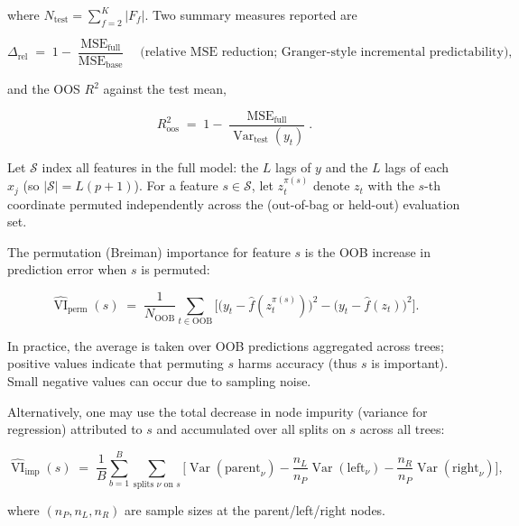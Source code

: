 \documentclass[preprint, 3p,
authoryear]{elsarticle} %
\begin{document}
\noindent where \(N_{\text{test}}=\sum_{f=2}^K |F_f|\). Two summary
measures reported are

\begin{equation}
\Delta_{\text{rel}} \;=\; 1-\frac{\operatorname{MSE}_{\text{full}}}{\operatorname{MSE}_{\text{base}}}
\quad\text{(relative MSE reduction; Granger-style incremental predictability),}
\end{equation}

\noindent and the OOS \(R^2\) against the test mean,

\begin{equation}
R^2_{\text{oos}} \;=\; 1 - \frac{\operatorname{MSE}_{\text{full}}}{\operatorname{Var}_{\text{test}}(y_t)}.
\end{equation}

Let \(\mathcal{S}\) index all features in the full model: the \(L\) lags
of \(y\) and the \(L\) lags of each \(x_j\) (so
\(|\mathcal{S}| = L(p+1)\)). For a feature \(s\in\mathcal{S}\), let
\(z_t^{\pi(s)}\) denote \(z_t\) with the \(s\)-th coordinate permuted
independently across the (out-of-bag or held-out) evaluation set.

The permutation (Breiman) importance for feature \(s\) is the OOB
increase in prediction error when \(s\) is permuted:

\begin{equation}
\widehat{\operatorname{VI}}_{\text{perm}}(s)
\;=\;
\frac{1}{N_{\text{OOB}}}\sum_{t\in\text{OOB}}
\Big[
\big(y_t - \widehat f(z_t^{\pi(s)})\big)^2
-
\big(y_t - \widehat f(z_t)\big)^2
\Big].
\end{equation}

In practice, the average is taken over OOB predictions aggregated across
trees; positive values indicate that permuting \(s\) harms accuracy
(thus \(s\) is important). Small negative values can occur due to
sampling noise.

Alternatively, one may use the total decrease in node impurity (variance
for regression) attributed to \(s\) and accumulated over all splits on
\(s\) across all trees:

\begin{equation}
\widehat{\operatorname{VI}}_{\text{imp}}(s)
\;=\;
\frac{1}{B}\sum_{b=1}^B
\sum_{\text{splits } \nu \text{ on } s}
\Big[
\operatorname{Var}(\text{parent}_\nu)
-
\frac{n_L}{n_P}\operatorname{Var}(\text{left}_\nu)
-
\frac{n_R}{n_P}\operatorname{Var}(\text{right}_\nu)
\Big],
\end{equation}

\noindent where \((n_P,n_L,n_R)\) are sample sizes at the
parent/left/right nodes.
\end{document}
